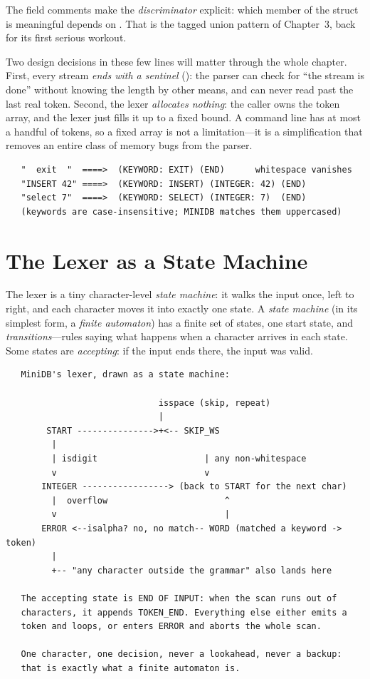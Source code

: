 The field comments make the \emph{discriminator} explicit: which member
of the struct is meaningful depends on . That is the tagged
union pattern of Chapter~3, back for its first serious workout.

Two design decisions in these few lines will matter through the whole
chapter. First, every stream \emph{ends with a sentinel}
(): the parser can check for ``the stream is done''
without knowing the length by other means, and can never read past the
last real token. Second, the lexer \emph{allocates nothing}: the
caller owns the token array, and the lexer just fills it up to a fixed
bound. A command line has at most a handful of tokens, so a fixed
array is not a limitation---it is a simplification that removes an
entire class of memory bugs from the parser.

\begin{verbatim}
   "  exit  "  ====>  (KEYWORD: EXIT) (END)      whitespace vanishes
   "INSERT 42" ====>  (KEYWORD: INSERT) (INTEGER: 42) (END)
   "select 7"  ====>  (KEYWORD: SELECT) (INTEGER: 7)  (END)
   (keywords are case-insensitive; MINIDB matches them uppercased)
\end{verbatim}

\section{The Lexer as a State Machine}

The lexer is a tiny character-level \emph{state machine}: it walks the
input once, left to right, and each character moves it into exactly one
state. A \emph{state machine} (in its simplest form, a \emph{finite
automaton}) has a finite set of states, one start state, and
\emph{transitions}---rules saying what happens when a character
arrives in each state. Some states are \emph{accepting}: if the input
ends there, the input was valid.

\begin{verbatim}
   MiniDB's lexer, drawn as a state machine:

                              isspace (skip, repeat)
                              |
        START --------------->+<-- SKIP_WS
         |
         | isdigit                     | any non-whitespace
         v                             v
       INTEGER -----------------> (back to START for the next char)
         |  overflow                       ^
         v                                 |
       ERROR <--isalpha? no, no match-- WORD (matched a keyword -> token)
         |
         +-- "any character outside the grammar" also lands here

   The accepting state is END OF INPUT: when the scan runs out of
   characters, it appends TOKEN_END. Everything else either emits a
   token and loops, or enters ERROR and aborts the whole scan.

   One character, one decision, never a lookahead, never a backup:
   that is exactly what a finite automaton is.
\end{verbatim}

